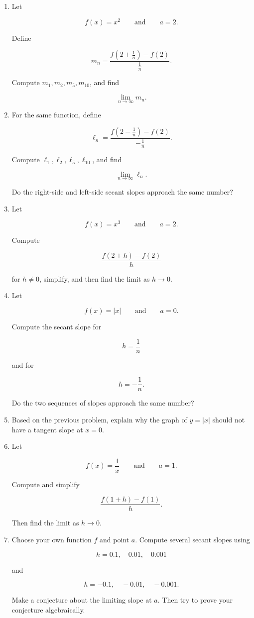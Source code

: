 \begin{enumerate}
\item Let

\[
f(x)=x^2
\qquad\text{and}\qquad
a=2.
\]

Define

\[
m_n=\frac{f\left(2+\frac1n\right)-f(2)}{\frac1n}.
\]

Compute \(m_1,m_2,m_5,m_{10}\), and find

\[
\lim_{n\to\infty}m_n.
\]

\item For the same function, define

\[
\ell_n=\frac{f\left(2-\frac1n\right)-f(2)}{-\frac1n}.
\]

Compute \(\ell_1,\ell_2,\ell_5,\ell_{10}\), and find

\[
\lim_{n\to\infty}\ell_n.
\]

Do the right-side and left-side secant slopes approach the same number?

\item Let

\[
f(x)=x^3
\qquad\text{and}\qquad
a=2.
\]

Compute

\[
\frac{f(2+h)-f(2)}{h}
\]

for \(h\neq0\), simplify, and then find the limit as \(h\to0\).

\item Let

\[
f(x)=|x|
\qquad\text{and}\qquad
a=0.
\]

Compute the secant slope for

\[
h=\frac1n
\]

and for

\[
h=-\frac1n.
\]

Do the two sequences of slopes approach the same number?

\item Based on the previous problem, explain why the graph of \(y=|x|\) should not have a tangent slope at \(x=0\).

\item Let

\[
f(x)=\frac1x
\qquad\text{and}\qquad
a=1.
\]

Compute and simplify

\[
\frac{f(1+h)-f(1)}{h}.
\]

Then find the limit as \(h\to0\).

\item Choose your own function \(f\) and point \(a\).  Compute several secant slopes using

\[
h=0.1,\quad 0.01,\quad 0.001
\]

and

\[
h=-0.1,\quad -0.01,\quad -0.001.
\]

Make a conjecture about the limiting slope at \(a\).  Then try to prove your conjecture algebraically.
\end{enumerate}

